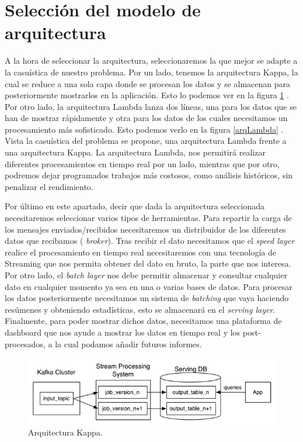 \section{Selección del modelo de arquitectura\label{arqSelect}}
A la hora de seleccionar la arquitectura, seleccionaremos la que mejor se
adapte a la casuística de nuestro problema. Por un lado, tenemos la
arquitectura Kappa, la cual se reduce a una sola capa donde se procesan los
datos y se almacenan para posteriormente mostrarlos en la aplicación. Esto
lo podemos ver en la figura \ref{arqKappa} \cite{LambdaKappa2}. Por otro
lado, la arquitectura Lambda lanza dos líneas, una para los datos que se
han de mostrar rápidamente y otra para los datos de los cuales necesitamos
un procesamiento más sofisticado. Esto podemos verlo en la figura
\ref{arqLambda} \cite{LambdaKappa}. Vista la casuística del problema se
propone, una arquitectura Lambda frente a una arquitectura Kappa.
La arquitectura Lambda, nos permitirá realizar diferentes
procesamientos en tiempo real por un lado, mientras que por otro,
podremos dejar programados trabajos más costosos, como análisis
históricos,  sin penalizar el rendimiento.

Por último en este apartado, decir que dada la arquitectura
seleccionada necesitaremos seleccionar varios tipos de
herramientas. Para repartir la carga de los mensajes enviados/recibidos
necesitaremos un distribuidor de los diferentes datos que recibamos ({\em
  broker}). Tras recibir el dato necesitamos que el {\em speed layer}
realice el procesamiento en tiempo real necesitaremos con una tecnología de
Streaming que nos permita obtener del dato en bruto, la parte que nos
interesa. Por otro lado, el {\em batch layer} nos debe permitir almacenar y
consultar cualquier dato en cualquier momento ya sea en una o varias bases
de datos. Para procesar los datos posteriormente necesitamos un sistema de
{\em batching} que vaya haciendo resúmenes y obteniendo estadísticas, esto
se almacenará en el {\em serving layer}. Finalmente, para poder mostrar
dichos datos, necesitamos una plataforma de dashboard que nos ayude a
mostrar los datos en tiempo real y los post-procesados, a la cual podamos
añadir futuros informes.

\begin{figure}[htp]
\centering
\includegraphics[scale=0.70]{Imagenes/arq1.png}
\caption{Arquitectura Kappa.}
\label{arqKappa}
\end{figure}

